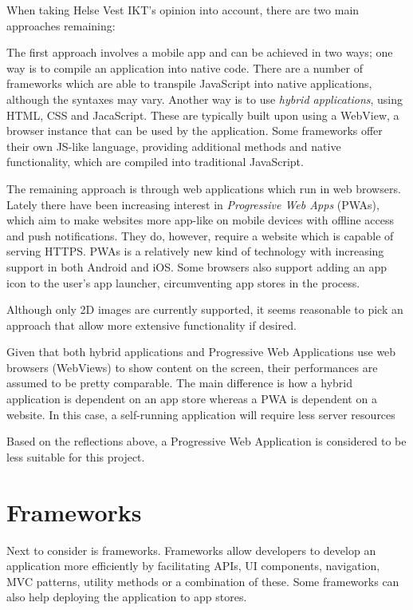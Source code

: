 When taking Helse Vest IKT's opinion into account, there are two main approaches remaining:

The first approach involves a mobile app and can be achieved in two ways; one way is to compile an application into native code. There are a number of frameworks which are able to transpile JavaScript into native applications, although the syntaxes may vary. Another way is to use \emph{hybrid applications}, using HTML, CSS and JacaScript. These are typically built upon using a WebView, a browser instance that can be used by the application. Some frameworks offer their own JS-like language, providing additional methods and native functionality, which are compiled into traditional JavaScript.

The remaining approach is through web applications which run in web browsers. Lately there have been increasing interest in \emph{Progressive Web Apps} (PWAs), which aim to make websites more app-like on mobile devices with offline access and push notifications. They do, however, require a website which is capable of serving HTTPS. PWAs is a relatively new kind of technology with increasing support in both Android and iOS. Some browsers also support adding an app icon to the user's app launcher, circumventing app stores in the process.

Although only 2D images are currently supported, it seems reasonable to pick an approach that allow more extensive functionality if desired.

Given that both hybrid applications and Progressive Web Applications use web browsers (WebViews) to show content on the screen, their performances are assumed to be pretty comparable. The main difference is how a hybrid application is dependent on an app store whereas a PWA is dependent on a website. In this case, a self-running application will require less server resources

Based on the reflections above, a Progressive Web Application is considered to be less suitable for this project.

\section{Frameworks}

Next to consider is frameworks. Frameworks allow developers to develop an application more efficiently by facilitating APIs, UI components, navigation, MVC patterns, utility methods or a combination of these. Some frameworks can also help deploying the application to app stores.


